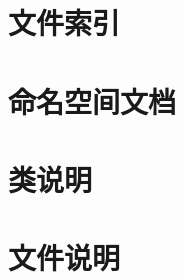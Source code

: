 \documentclass[twoside]{book}
\newcommand{\+}{\discretionary{\mbox{\scriptsize$\hookleftarrow$}}{}{}}
\newcommand{\clearemptydoublepage}{%
    \newpage{\pagestyle{empty}\cleardoublepage}%
  }
\begin{document}
\begin{CJK}{UTF8}{gbsn}
\chapter{文件索引}

\chapter{命名空间文档}

\chapter{类说明}










\chapter{文件说明}









































  \backmatter
  \newpage
  \clearemptydoublepage
  \printindex
\end{CJK}
\end{document}
